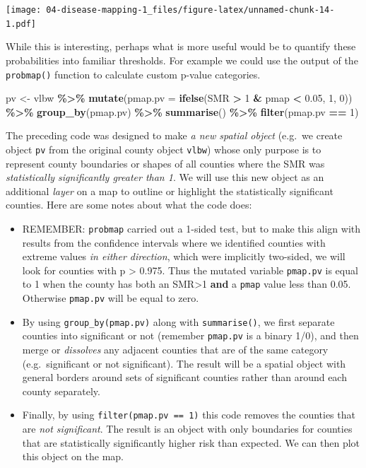 \documentclass[
]{book}
\newenvironment{Shaded}{\begin{snugshade}}{\end{snugshade}}
\newcommand{\AttributeTok}[1]{\textcolor[rgb]{0.13,0.29,0.53}{#1}}
\newcommand{\DecValTok}[1]{\textcolor[rgb]{0.00,0.00,0.81}{#1}}
\newcommand{\FloatTok}[1]{\textcolor[rgb]{0.00,0.00,0.81}{#1}}
\newcommand{\FunctionTok}[1]{\textcolor[rgb]{0.13,0.29,0.53}{\textbf{#1}}}
\newcommand{\NormalTok}[1]{#1}
\newcommand{\OtherTok}[1]{\textcolor[rgb]{0.56,0.35,0.01}{#1}}
\newcommand{\SpecialCharTok}[1]{\textcolor[rgb]{0.81,0.36,0.00}{\textbf{#1}}}
\providecommand{\tightlist}{%
  \setlength{\itemsep}{0pt}\setlength{\parskip}{0pt}}
\begin{document}
\texttt{[image: 04-disease-mapping-1\_files/figure-latex/unnamed-chunk-14-1.pdf]}

While this is interesting, perhaps what is more useful would be to quantify these probabilities into familiar thresholds. For example we could use the output of the \texttt{probmap()} function to calculate custom p-value categories.

\begin{Shaded}
\begin{Highlighting}[]
\NormalTok{pv }\OtherTok{\textless{}{-}}\NormalTok{ vlbw }\SpecialCharTok{\%\textgreater{}\%}
  \FunctionTok{mutate}\NormalTok{(}\AttributeTok{pmap.pv =} \FunctionTok{ifelse}\NormalTok{(SMR }\SpecialCharTok{\textgreater{}} \DecValTok{1} \SpecialCharTok{\&}\NormalTok{ pmap }\SpecialCharTok{\textless{}} \FloatTok{0.05}\NormalTok{, }\DecValTok{1}\NormalTok{, }\DecValTok{0}\NormalTok{)) }\SpecialCharTok{\%\textgreater{}\%}
  \FunctionTok{group\_by}\NormalTok{(pmap.pv) }\SpecialCharTok{\%\textgreater{}\%}
  \FunctionTok{summarise}\NormalTok{() }\SpecialCharTok{\%\textgreater{}\%}
  \FunctionTok{filter}\NormalTok{(pmap.pv }\SpecialCharTok{==} \DecValTok{1}\NormalTok{)}
\end{Highlighting}
\end{Shaded}

The preceding code was designed to make \emph{a new spatial object} (e.g.~we create object \texttt{pv} from the original county object \texttt{vlbw}) whose only purpose is to represent county boundaries or shapes of all counties where the SMR was \emph{statistically significantly greater than 1}. We will use this new object as an additional \emph{layer} on a map to outline or highlight the statistically significant counties. Here are some notes about what the code does:

\begin{itemize}
\tightlist
\item
  REMEMBER: \texttt{probmap} carried out a 1-sided test, but to make this align with results from the confidence intervals where we identified counties with extreme values \emph{in either direction}, which were implicitly two-sided, we will look for counties with p \textgreater{} 0.975. Thus the mutated variable \texttt{pmap.pv} is equal to 1 when the county has both an SMR\textgreater1 \textbf{and} a \texttt{pmap} value less than 0.05. Otherwise \texttt{pmap.pv} will be equal to zero.
\item
  By using \texttt{group\_by(pmap.pv)} along with \texttt{summarise()}, we first separate counties into significant or not (remember \texttt{pmap.pv} is a binary 1/0), and then merge or \emph{dissolves} any adjacent counties that are of the same category (e.g.~significant or not significant). The result will be a spatial object with general borders around sets of significant counties rather than around each county separately.
\item
  Finally, by using \texttt{filter(pmap.pv\ ==\ 1)} this code removes the counties that are \emph{not significant}. The result is an object with only boundaries for counties that are statistically significantly higher risk than expected. We can then plot this object on the map.
\end{itemize}
\end{document}
